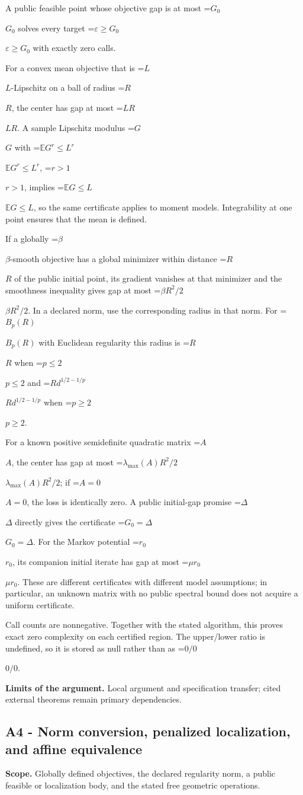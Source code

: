 \documentclass[10pt,a4paper]{article}
\newcommand{\AtlasMath}[1]{\par\begingroup\centering\setbox0=\hbox{$\displaystyle #1$}\ifdim\wd0>1.4\linewidth\typeout{ATLAS WIDE FORMULA: \the\wd0}\fi\ifdim\wd0>\linewidth\resizebox{\linewidth}{!}{\box0}\else\box0\fi\par\endgroup}
\newcommand{\AtlasInlineMath}[1]{\begingroup\setbox0=\hbox{$#1$}\ifdim\wd0>.4\linewidth\endgroup\AtlasMath{#1}\else\endgroup$#1$\fi}
\begin{document}
A public feasible point whose objective gap is at most \AtlasInlineMath{G_0} solves every target \AtlasInlineMath{\varepsilon\ge G_0} with exactly zero calls.

For a convex mean objective that is \AtlasInlineMath{L}-Lipschitz on a ball of radius \AtlasInlineMath{R}, the center has gap at most \AtlasInlineMath{LR}. A sample Lipschitz modulus \AtlasInlineMath{G} with \AtlasInlineMath{\mathbb E G^r\le L^r}, \AtlasInlineMath{r>1}, implies \AtlasInlineMath{\mathbb E G\le L}, so the same certificate applies to moment models. Integrability at one point ensures that the mean is defined.

If a globally \AtlasInlineMath{\beta}-smooth objective has a global minimizer within distance \AtlasInlineMath{R} of the public initial point, its gradient vanishes at that minimizer and the smoothness inequality gives gap at most \AtlasInlineMath{\beta R^2/2}. In a declared norm, use the corresponding radius in that norm. For \AtlasInlineMath{B_p(R)} with Euclidean regularity this radius is \AtlasInlineMath{R} when \AtlasInlineMath{p\le2} and \AtlasInlineMath{R d^{1/2-1/p}} when \AtlasInlineMath{p\ge2}.

For a known positive semidefinite quadratic matrix \AtlasInlineMath{A}, the center has gap at most \AtlasInlineMath{\lambda_{\max}(A)R^2/2}; if \AtlasInlineMath{A=0}, the loss is identically zero. A public initial-gap promise \AtlasInlineMath{\Delta} directly gives the certificate \AtlasInlineMath{G_0=\Delta}. For the Markov potential \AtlasInlineMath{r_0}, its companion initial iterate has gap at most \AtlasInlineMath{\mu r_0}. These are different certificates with different model assumptions; in particular, an unknown matrix with no public spectral bound does not acquire a uniform certificate.

Call counts are nonnegative. Together with the stated algorithm, this proves exact zero complexity on each certified region. The upper/lower ratio is undefined, so it is stored as null rather than as \AtlasInlineMath{0/0}.

\textbf{Limits of the argument.} Local argument and specification transfer; cited external theorems remain primary dependencies.

\subsection{A4 - Norm conversion, penalized localization, and affine equivalence}
\textbf{Scope.} Globally defined objectives, the declared regularity norm, a public feasible or localization body, and the stated free geometric operations.
\end{document}
